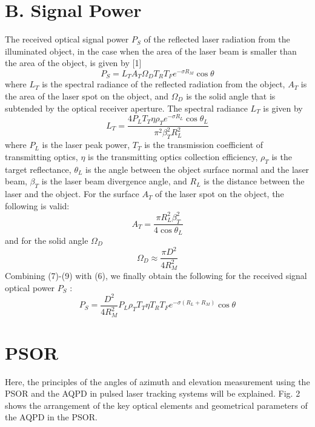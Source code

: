 \documentclass[10pt]{article}
\begin{document}
\section{B. Signal Power}
The received optical signal power \(P_{S}\) of the reflected laser radiation from the illuminated object, in the case when the area of the laser beam is smaller than the area of the object, is given by [1]
\[
P_{S}=L_{T} A_{T} \Omega_{D} T_{R} T_{F} e^{-\sigma R_{M}} \cos \theta
\]
where \(L_{T}\) is the spectral radiance of the reflected radiation from the object, \(A_{T}\) is the area of the laser spot on the object, and \(\Omega_{D}\) is the solid angle that is subtended by the optical receiver aperture. The spectral radiance \(L_{T}\) is given by
\[
L_{T}=\frac{4 P_{L} T_{T} \eta \rho_{T} e^{-\sigma R_{L}} \cos \theta_{L}}{\pi^{2} \beta_{T}^{2} R_{L}^{2}}
\]
where \(P_{L}\) is the laser peak power, \(T_{T}\) is the transmission coefficient of transmitting optics, \(\eta\) is the transmitting optics collection efficiency, \(\rho_{T}\) is the target reflectance, \(\theta_{L}\) is the angle between the object surface normal and the laser beam, \(\beta_{T}\) is the laser beam divergence angle, and \(R_{L}\) is the distance between the laser and the object. For the surface \(A_{T}\) of the laser spot on the object, the following is valid:
\[
A_{T}=\frac{\pi R_{L}^{2} \beta_{T}^{2}}{4 \cos \theta_{L}}
\]
and for the solid angle \(\Omega_{D}\)
\[
\Omega_{D} \approx \frac{\pi D^{2}}{4 R_{M}^{2}}
\]
Combining (7)-(9) with (6), we finally obtain the following for the received signal optical power \(P_{S}\) :
\[
P_{S}=\frac{D^{2}}{4 R_{M}^{2}} P_{L} \rho_{T} T_{T} \eta T_{R} T_{F} e^{-\sigma\left(R_{L}+R_{M}\right)} \cos \theta
\]

\section{PSOR}
Here, the principles of the angles of azimuth and elevation measurement using the PSOR and the AQPD in pulsed laser tracking systems will be explained. Fig. 2 shows the arrangement of the key optical elements and geometrical parameters of the AQPD in the PSOR.
\end{document}
